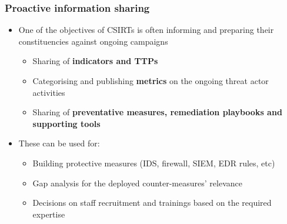 \begin{frame}
    \frametitle{Proactive information sharing}
    \begin{itemize}
        \item One of the objectives of CSIRTs is often informing and preparing their constituencies against ongoing campaigns
        \begin{itemize}
            \item Sharing of {\bf indicators and TTPs}
            \item Categorising and publishing {\bf metrics} on the ongoing threat actor activities
            \item Sharing of {\bf preventative measures, remediation playbooks and supporting tools}
        \end{itemize}
        \item These can be used for:
        \begin{itemize}
            \item Building protective measures (IDS, firewall, SIEM, EDR rules, etc)
            \item Gap analysis for the deployed counter-measures' relevance
            \item Decisions on staff recruitment and trainings based on the required expertise
        \end{itemize}
    \end{itemize}

\end{frame}

